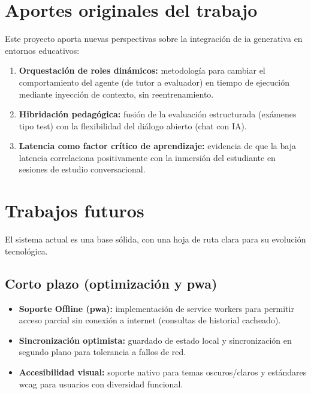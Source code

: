 \section{Aportes originales del trabajo}

Este proyecto aporta nuevas perspectivas sobre la integración de \gls{ia} generativa en entornos educativos:

\begin{enumerate}
\item \textbf{Orquestación de roles dinámicos:} metodología para cambiar el comportamiento del agente (de tutor a evaluador) en tiempo de ejecución mediante inyección de contexto, sin reentrenamiento.
\item \textbf{Hibridación pedagógica:} fusión de la evaluación estructurada (exámenes tipo test) con la flexibilidad del diálogo abierto (chat con IA).
\item \textbf{Latencia como factor crítico de aprendizaje:} evidencia de que la baja latencia correlaciona positivamente con la inmersión del estudiante en sesiones de estudio conversacional.
\end{enumerate}

\section{Trabajos futuros}

El sistema actual es una base sólida, con una hoja de ruta clara para su evolución tecnológica.

\subsection{Corto plazo (optimización y \gls{pwa})}
\begin{itemize}
\item \textbf{Soporte Offline (\gls{pwa}):} implementación de service workers para permitir acceso parcial sin conexión a internet (consultas de historial cacheado).
\item \textbf{Sincronización optimista:} guardado de estado local y sincronización en segundo plano para tolerancia a fallos de red.
\item \textbf{Accesibilidad visual:} soporte nativo para temas oscuros/claros y estándares \gls{wcag} para usuarios con diversidad funcional.
\end{itemize}

